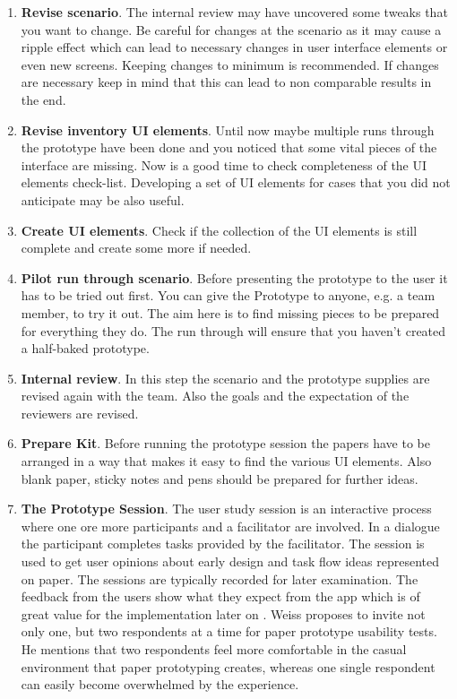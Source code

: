\begin{enumerate}
	\item \textbf{Revise scenario}. The internal review may have uncovered some tweaks that you want to change. Be careful for changes at the scenario as it may cause a ripple effect which can lead to necessary changes in user interface elements or even new screens. Keeping changes to minimum is recommended. If changes are necessary keep in mind that this can lead to non comparable results in the end.
		
	\item \textbf{Revise inventory UI elements}.
	Until now maybe multiple runs through the prototype have been done and you noticed that some vital pieces of the interface are missing. Now is a good time to check completeness of the UI elements check-list. Developing a set of UI elements for cases that you did not anticipate may be also useful.
	
	\item \textbf{Create UI elements}.
	Check if the collection of the UI elements is still complete and create some more if needed.
	
	\item \textbf{Pilot run through scenario}. Before presenting the prototype to the user it has to be tried out first. You can give the Prototype to anyone, e.g. a team member, to try it out. The aim here is to find missing pieces to be prepared for everything they do. The run through will ensure that you haven't created a half-baked prototype.
	
	\item \textbf{Internal review}. 	
	In this step the scenario and the prototype supplies are revised again with the team. Also the goals and the expectation of the reviewers are revised.
	
	\item \textbf{Prepare Kit}. Before running the prototype session the papers have to be arranged in a way that makes it easy to find the various UI elements. Also blank paper, sticky notes and pens should be prepared for further ideas.
	
	\item \textbf{The Prototype Session}. The user study session is an interactive process where one ore more participants and a facilitator are involved. In a dialogue the participant completes tasks provided by the facilitator. The session is used to get user opinions about early design and task flow ideas represented on paper. The sessions are typically recorded for later examination. The feedback from the users show what they expect from the app which is of great value for the implementation later on \cite{snyder2003paper}. Weiss  \cite[p.~144]{weiss2003handheld} proposes to invite not only one, but two respondents at a time for paper prototype usability tests. He mentions that two respondents feel more comfortable in the casual environment that paper prototyping creates, whereas one single respondent can easily become overwhelmed by the experience.
	

\end{enumerate}
